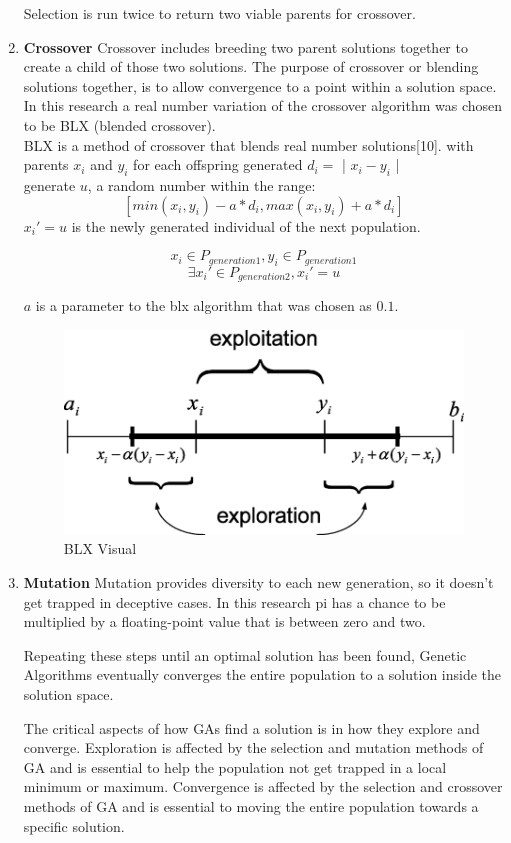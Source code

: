 \documentclass[twocolumn]{article}
\begin{document}
\begin{enumerate}
Selection is run twice to return two viable parents for crossover. 

\item \textbf{Crossover}
Crossover includes breeding two parent solutions together to create a child of those two solutions. The purpose of crossover or blending solutions together, is to allow convergence to a point within a solution space. In this research a real number variation of the crossover algorithm was chosen to be BLX (blended crossover).\\

BLX is a method of crossover that blends real number solutions[10]. with parents $x_i$ and $y_i$ for each offspring generated $d_i = $ | $x_i - y_i $ |\\

generate $u$, a random number within the range: \\
$$ [ min (x_i, y_i) - a * d_i, max(x_i, y_i) + a * d_i ] $$
$x_i' = u$ is the newly generated individual of the next population.

$$ x_i \in P_{generation1} , y_i \in P_{generation1} $$
$$ \exists x_i' \in P_{generation2} , x_i' = u $$ 

$a$ is a parameter to the blx algorithm that was chosen as $0.1$.

\begin{figure}[h!]
\includegraphics[scale=0.26]{Images/blx.png} 
\caption{BLX Visual}
\end{figure}


\item \textbf{Mutation}
Mutation provides diversity to each new generation, so it doesn't get trapped in deceptive cases. In this research pi has a chance to be multiplied by a floating-point value that is between zero and two.

Repeating these steps until an optimal solution has been found, Genetic Algorithms eventually converges the entire population to a solution inside the solution space.

The critical aspects of how GAs find a solution is in how they explore and converge. Exploration is affected by the selection and mutation methods of GA and is essential to help the population not get trapped in a local minimum or maximum. Convergence is affected by the selection and crossover methods of GA and is essential to moving the entire population towards a specific solution.
\end{enumerate}
\end{document}
